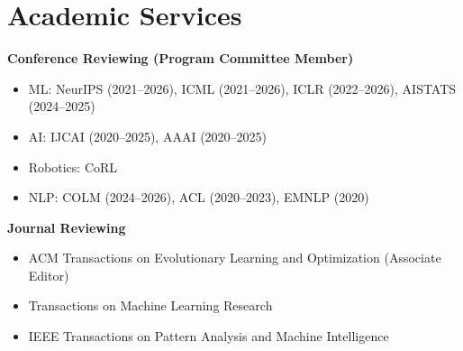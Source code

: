 \section{Academic Services}

\begin{description}[leftmargin=*,style=nextline]
\item{\textbf{Conference Reviewing (Program Committee Member)}}
\begin{itemize}[leftmargin=*,itemsep=0.2em]
\item ML: NeurIPS (2021--2026), ICML (2021--2026), ICLR (2022--2026), AISTATS (2024--2025)
\item AI: IJCAI (2020--2025), AAAI (2020--2025)
\item Robotics: CoRL
\item NLP: COLM (2024--2026), ACL (2020--2023), EMNLP (2020)
\end{itemize}

\item{\textbf{Journal Reviewing}}
\begin{itemize}[leftmargin=*,itemsep=0.2em]
\item ACM Transactions on Evolutionary Learning and Optimization (Associate Editor)
\item Transactions on Machine Learning Research
\item IEEE Transactions on Pattern Analysis and Machine Intelligence
\end{itemize}
\end{description}
